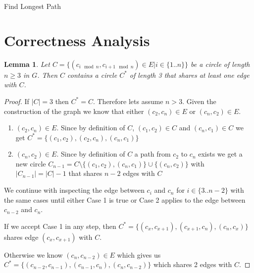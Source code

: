 \documentclass{article}
\newtheorem{lemma}[theorem]{Lemma}
\begin{document}
\begin{algorithm}\label{alg:longestPath}
\caption{Find Longest Path}
\DontPrintSemicolon


\end{algorithm}

\section{Correctness Analysis}
\begin{lemma}\label{lma:Circle3}
    Let $C=\{(c_{i\mod n},c_{i+1 \mod n})\in E | i \in \{1..n\}\}$ be a circle of length $n\geq 3$ in $G$. Then $C$ contains a circle $C^*$ of length 3 that shares at least one edge with $C$.
\end{lemma}
\begin{proof}
    If $|C|=3$ then $C^*=C$. Therefore lets assume $n > 3$. Given the construction of the graph we know that either $(c_2,c_n) \in E$ or $(c_n,c_2) \in E$. 
    \begin{enumerate}[label=\textbf{Case \arabic*:}, left=0pt, itemindent=*, labelindent=1em]
        \item $(c_2,c_n) \in E$. Since by definition of $C$, $(c_1,c_2) \in C$ and $(c_n,c_1) \in C$ we get $C^*=\{(c_1,c_2),(c_2,c_n),(c_n,c_1)\}$
        \item $(c_n,c_2) \in E$. Since by definition of $C$ a path from $c_2$ to $c_n$ exists we get a new circle $C_{n-1}=C  \setminus \{(c_1,c_2),(c_n,c_1)\} \cup \{(c_n,c_2)\}$ with $|C_{n-1}|=|C|-1$ that shares $n-2$ edges with $C$
    \end{enumerate}
We continue with inspecting the edge between $c_i$ and $c_n$ for $i \in \{3..n-2\}$ with the same cases until either Case 1 is true or Case 2 applies to the edge between $c_{n-2}$ and $c_n$. 

If we accept Case 1 in any step, then $C^*=\{(c_x,c_{x+1}),(c_{x+1},c_n),(c_n,c_x)\}$ shares edge $(c_x,c_{x+1})$ with $C$.

Otherwise we know $(c_n,c_{n-2}) \in E$ which gives us $C^*=\{(c_{n-2},c_{n-1}),(c_{n-1},c_n),(c_n,c_{n-2})\}$
which shares 2 edges with $C$.
\end{proof}
\end{document}
